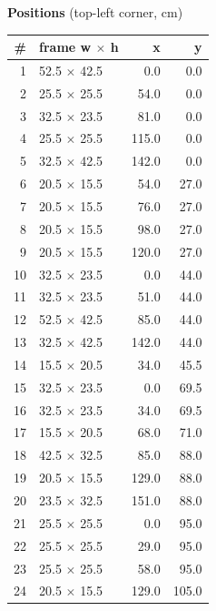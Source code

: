 \documentclass[a4paper,landscape,10pt]{article}
\begin{document}
\begin{minipage}[t]{0.25\textwidth}
\vspace{8pt}
{\bfseries Positions} (top-left corner, cm)\\[2pt]
\tiny
\begin{tabular}{@{}r l r r@{}}
\toprule
\# & frame w $\times$ h & x & y \\
\midrule
1 & 52.5 $\times$ 42.5 & 0.0 & 0.0 \\
2 & 25.5 $\times$ 25.5 & 54.0 & 0.0 \\
3 & 32.5 $\times$ 23.5 & 81.0 & 0.0 \\
4 & 25.5 $\times$ 25.5 & 115.0 & 0.0 \\
5 & 32.5 $\times$ 42.5 & 142.0 & 0.0 \\
6 & 20.5 $\times$ 15.5 & 54.0 & 27.0 \\
7 & 20.5 $\times$ 15.5 & 76.0 & 27.0 \\
8 & 20.5 $\times$ 15.5 & 98.0 & 27.0 \\
9 & 20.5 $\times$ 15.5 & 120.0 & 27.0 \\
10 & 32.5 $\times$ 23.5 & 0.0 & 44.0 \\
11 & 32.5 $\times$ 23.5 & 51.0 & 44.0 \\
12 & 52.5 $\times$ 42.5 & 85.0 & 44.0 \\
13 & 32.5 $\times$ 42.5 & 142.0 & 44.0 \\
14 & 15.5 $\times$ 20.5 & 34.0 & 45.5 \\
15 & 32.5 $\times$ 23.5 & 0.0 & 69.5 \\
16 & 32.5 $\times$ 23.5 & 34.0 & 69.5 \\
17 & 15.5 $\times$ 20.5 & 68.0 & 71.0 \\
18 & 42.5 $\times$ 32.5 & 85.0 & 88.0 \\
19 & 20.5 $\times$ 15.5 & 129.0 & 88.0 \\
20 & 23.5 $\times$ 32.5 & 151.0 & 88.0 \\
21 & 25.5 $\times$ 25.5 & 0.0 & 95.0 \\
22 & 25.5 $\times$ 25.5 & 29.0 & 95.0 \\
23 & 25.5 $\times$ 25.5 & 58.0 & 95.0 \\
24 & 20.5 $\times$ 15.5 & 129.0 & 105.0 \\
\bottomrule
\end{tabular}
\end{minipage}
\clearpage
\end{document}

